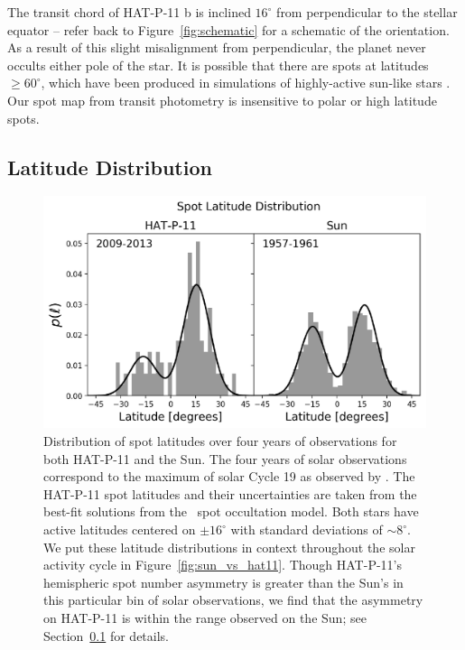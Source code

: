 The transit chord of HAT-P-11 b is inclined $16^\circ$ from perpendicular to the stellar equator -- refer back to Figure~\ref{fig:schematic} for a schematic of the orientation. As a result of this slight misalignment from perpendicular, the planet never occults either pole of the star. It is possible that there are spots at latitudes $\ge 60^\circ$, which have been produced in simulations of highly-active sun-like stars \citep[e.g.][]{Schrijver2001}. Our spot map from transit photometry is insensitive to polar or high latitude spots. 

\subsection{Latitude Distribution} \label{sec:lat_dist}

\begin{figure}
\centering
\includegraphics[scale=0.8]{stsp_hat_p_11/asymmetric_latitudes.pdf}
\caption{Distribution of spot latitudes over four years of observations for both HAT-P-11 and the Sun. The four years of solar observations correspond to the maximum of solar Cycle 19 as observed by \citet{Howard1984}. The HAT-P-11 spot latitudes and their uncertainties are taken from the best-fit solutions from the \stsp\ spot occultation model. Both stars have active latitudes centered on $\pm 16^\circ$ with standard deviations of $\sim 8^\circ$. We put these latitude distributions in context throughout the solar activity cycle in Figure~\ref{fig:sun_vs_hat11}. Though HAT-P-11's hemispheric spot number asymmetry is greater than the Sun's in this particular bin of solar observations, we find that the asymmetry on HAT-P-11 is within the range observed on the Sun; see Section~\ref{sec:lat_dist} for details.}
\label{fig:latitude_model}
\end{figure}

